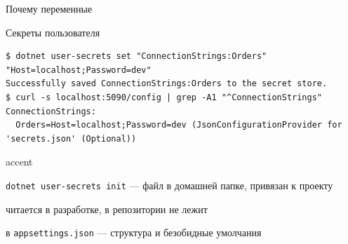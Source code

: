 \documentclass[aspectratio=169,10pt,t]{beamer}
\newcommand{\termsm}{\ttfamily\fontsize{6.6}{7.9}\selectfont}
\begin{document}
\begin{frame}{Почему переменные}
  \slidetop

  \slidegap
\end{frame}

\begin{frame}[fragile]{Секреты пользователя}
  \slidetop
\begin{lstlisting}[style=term,basicstyle=\termsm]
$ dotnet user-secrets set "ConnectionStrings:Orders" "Host=localhost;Password=dev"
Successfully saved ConnectionStrings:Orders to the secret store.
$ curl -s localhost:5090/config | grep -A1 "^ConnectionStrings"
ConnectionStrings:
  Orders=Host=localhost;Password=dev (JsonConfigurationProvider for 'secrets.json' (Optional))
\end{lstlisting}

  \slidegap
  \begin{cbul}{accent}
    \item \texttt{dotnet user-secrets init} --- файл в домашней папке, привязан к проекту
    \item читается  в разработке, в репозитории не лежит
    \item в \texttt{appsettings.json} --- структура и безобидные умолчания
  \end{cbul}

\end{frame}

\begin{frame}[plain]
\end{frame}
\end{document}
